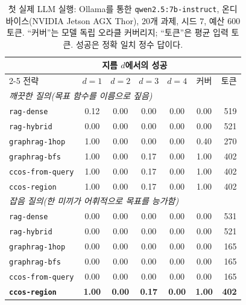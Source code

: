 \documentclass[11pt]{article}
\newcommand{\code}[1]{\texttt{#1}}
\begin{document}
\begin{table}[h]
\centering
\begin{tabular}{lcccccr}
\toprule
& \multicolumn{4}{c}{지름 $d$에서의 성공} & & \\
\cmidrule(lr){2-5}
전략 & $d{=}1$ & $d{=}2$ & $d{=}3$ & $d{=}4$ & 커버 & 토큰 \\
\midrule
\multicolumn{7}{l}{\emph{깨끗한 질의(목표 함수를 이름으로 짚음)}}\\
\code{rag-dense}      & 0.12 & 0.00 & 0.00 & 0.00 & 0.00 & 519 \\
\code{rag-hybrid}     & 0.00 & 0.00 & 0.00 & 0.00 & 0.00 & 521 \\
\code{graphrag-1hop}  & 1.00 & 0.00 & 0.00 & 0.00 & 0.40 & 270 \\
\code{graphrag-bfs}   & 1.00 & 0.00 & 0.17 & 0.00 & 1.00 & 402 \\
\code{ccos-from-query}& 1.00 & 0.00 & 0.17 & 0.00 & 1.00 & 402 \\
\code{ccos-region}    & 1.00 & 0.00 & 0.17 & 0.00 & 1.00 & 402 \\
\midrule
\multicolumn{7}{l}{\emph{잡음 질의(한 미끼가 어휘적으로 목표를 능가함)}}\\
\code{rag-dense}      & 0.00 & 0.00 & 0.00 & 0.00 & 0.00 & 531 \\
\code{rag-hybrid}     & 0.00 & 0.00 & 0.00 & 0.00 & 0.00 & 521 \\
\code{graphrag-1hop}  & 0.00 & 0.00 & 0.00 & 0.00 & 0.00 & 165 \\
\code{graphrag-bfs}   & 0.00 & 0.00 & 0.00 & 0.00 & 0.00 & 165 \\
\code{ccos-from-query}& 0.00 & 0.00 & 0.00 & 0.00 & 0.00 & 165 \\
\textbf{\code{ccos-region}} & \textbf{1.00} & \textbf{0.00} & \textbf{0.17} & \textbf{0.00} & \textbf{1.00} & \textbf{402} \\
\bottomrule
\end{tabular}
\caption{첫 실제 LLM 실행: Ollama를 통한 \code{qwen2.5:7b-instruct}, 온디바이스(NVIDIA Jetson AGX Thor),
$20$개 과제, 시드 $7$, 예산 $600$ 토큰. ``커버''는 모델 독립 오라클 커버리지; ``토큰''은 평균 입력 토큰. 성공은
정확 일치 정수 답이다.}
\label{tab:real}
\end{table}
\end{document}
